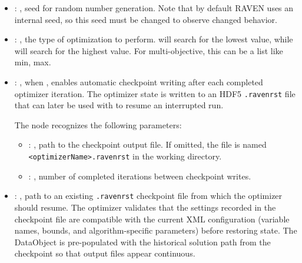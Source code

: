 \begin{itemize}
\begin{itemize}
        \item {}: ,
          seed for random number generation. Note that by default RAVEN uses an internal seed,
          so this seed must be changed to observe changed behavior. 

        \item {}: ,
          the type of optimization to perform.  will search for the lowest
           value, while  will search for the highest value.
          For multi-objective, this can be a list like min, max.

        \item {}: ,
          when , enables automatic checkpoint writing after each completed optimizer
          iteration. The optimizer state is written to an HDF5 \texttt{.ravenrst} file that can
          later be used with  to resume an interrupted run.

          The  node recognizes the following parameters:
          \begin{itemize}
            \item {}: ,
              path to the checkpoint output file. If omitted, the file is named
              \texttt{<optimizerName>.ravenrst} in the working directory.
            \item {}: ,
              number of completed iterations between checkpoint writes.
          \end{itemize}

        \item {}: ,
          path to an existing \texttt{.ravenrst} checkpoint file from which the optimizer should
          resume. The optimizer validates that the settings recorded in the checkpoint file are
          compatible with the current XML configuration (variable names, bounds, and
          algorithm-specific parameters) before restoring state. The 
          DataObject is pre-populated with the historical solution path from the checkpoint so
          that output files appear continuous.
      \end{itemize}


\end{itemize}

